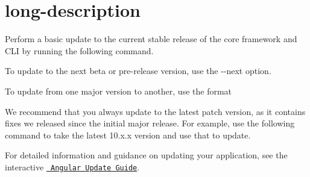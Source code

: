 \chapter{long-\/description}
\hypertarget{md__d_1_2_g_i_t_2_food_link_2foodlink_8client_2node__modules_2_0dangular_2cli_2src_2commands_2update_2long-description}{}\label{md__d_1_2_g_i_t_2_food_link_2foodlink_8client_2node__modules_2_0dangular_2cli_2src_2commands_2update_2long-description}
Perform a basic update to the current stable release of the core framework and CLI by running the following command.


\begin{DoxyCode}{0}

\end{DoxyCode}


To update to the next beta or pre-\/release version, use the {\ttfamily -\/-\/next} option.

To update from one major version to another, use the format


\begin{DoxyCode}{0}

\end{DoxyCode}


We recommend that you always update to the latest patch version, as it contains fixes we released since the initial major release. For example, use the following command to take the latest 10.\+x.\+x version and use that to update.


\begin{DoxyCode}{0}

\end{DoxyCode}


For detailed information and guidance on updating your application, see the interactive \href{https://update.angular.io/}{\texttt{ Angular Update Guide}}. 